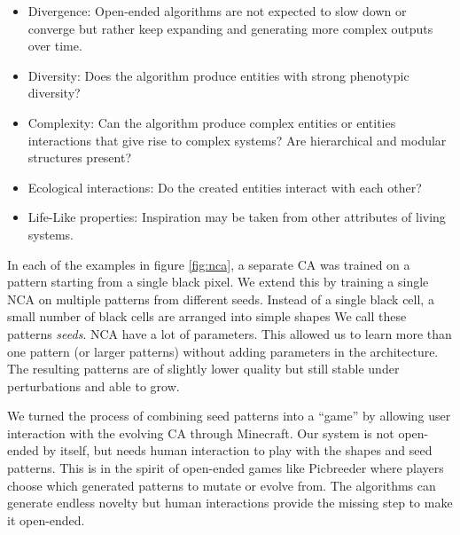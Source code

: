 \begin{itemize}
  \item Divergence: Open-ended algorithms are not expected to slow down or
        converge but rather keep expanding and generating more complex outputs
        over time.

  \item Diversity: Does the algorithm produce entities with strong phenotypic
        diversity?

  \item Complexity: Can the algorithm produce complex entities or entities
        interactions that give rise to complex systems? Are hierarchical and
        modular structures present?

  \item Ecological interactions: Do the created entities interact with each
        other?

  \item Life-Like properties: Inspiration may be taken from other attributes of
        living systems.
\end{itemize}

In each of the examples in figure \ref{fig:nca}, a separate \ac{CA} was trained
on a pattern starting from a single black pixel. We extend this by training a
single \ac{NCA} on multiple patterns from different seeds. Instead of a single
black cell, a small number of black cells are arranged into simple shapes We
call these patterns \emph{seeds}. \ac{NCA} have a lot of parameters. This
allowed us to learn more than one pattern (or larger patterns) without adding
parameters in the architecture. The resulting patterns are of slightly lower
quality but still stable under perturbations and able to grow.

We turned the process of combining seed patterns into a “game” by allowing user
interaction with the evolving CA through Minecraft. Our system is not open-ended
by itself, but needs human interaction to play with the shapes and seed
patterns. This is in the spirit of open-ended games like Picbreeder
\parencite{secretanPicbreederCaseStudy2011, woolleyDeleteriousEffectsPriori2011}
where players choose which generated patterns to mutate or evolve from. The
algorithms can generate endless novelty but human interactions provide the
missing step to make it open-ended.

